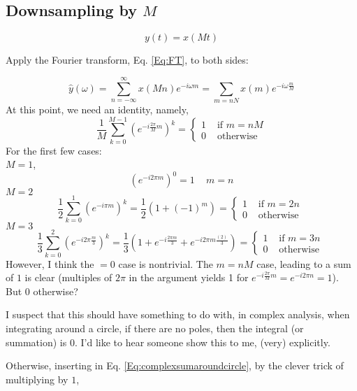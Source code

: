\documentclass[twoside]{amsart}
\theoremstyle{plain}
\theoremstyle{definition}
\theoremstyle{remark}
\numberwithin{equation}{section}
\begin{document}
\subsection*{Downsampling by $M$ }

\begin{equation}\label{Eq:downsamplingMt}
y(t) = x(Mt)
\end{equation}

Apply the Fourier transform, Eq. \ref{Eq:FT}, to both sides:

\[
\widehat{y}(\omega) = \sum_{n=-\infty}^{\infty} x(Mn) e^{-i\omega m} = \sum_{m=nN} x(m) e^{-i \omega \frac{m}{M}}
\]
At this point, we need an identity, namely, 
\begin{equation}\label{Eq:complexsumaroundcircle}
\frac{1}{M} \sum_{k=0}^{M-1} ( e^{ -i \frac{2\pi}{M} m } )^k = \begin{cases} 1 & \text{ if } m = n M \\ 0 & \text{ otherwise } \end{cases}
\end{equation}
For the first few cases: \\
$M=1$,
\[
(e^{ -i 2\pi m})^0 = 1 \quad \, m = n 
\]
$M=2$
\[
\frac{1}{2} \sum_{k=0}^1 (e^{-i \pi m })^k = \frac{1}{2} ( 1 + (-1)^m) = \begin{cases} 1 & \text{ if } m = 2n \\
  0 & \text{ otherwise } \end{cases}
\]
$M=3$
\[
\frac{1}{3} \sum_{k=0}^2 (e^{ -i2\pi \frac{m}{3} })^k = \frac{1}{3} ( 1 + e^{-i \frac{2\pi m}{3} } + e^{- i 2\pi m \frac{(2)}{3} } ) = \begin{cases} 1 & \text{ if } m = 3n \\ 0 & \text{ otherwise } \end{cases}
\]
However, I think the $=0$ case is nontrivial.  The $m=nM$ case, leading to a sum of $1$ is clear (multiples of $2\pi$ in the argument yields 1 for $e^{ -i \frac{ 2\pi }{M}m } = e^{-i 2\pi n }= 1$).  But $0$ otherwise? 

I suspect that this should have something to do with, in complex analysis, when integrating around a circle, if there are no poles, then the integral (or summation) is $0$.  I'd like to hear someone show this to me, (very) explicitly.

Otherwise, inserting in Eq. \ref{Eq:complexsumaroundcircle}, by the clever trick of multiplying by $1$,
\end{document}
